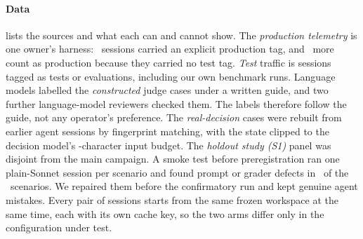 \paragraph{Data}  lists the sources and what each can and cannot show. The \emph{production
telemetry} is one owner's harness: \ObProdTagged\ sessions carried an explicit production tag, and \ObProdDefault\ more
count as production because they carried no test tag. \emph{Test} traffic is sessions tagged as tests or evaluations,
including our own benchmark runs. Language models labelled the \emph{constructed} judge cases under a written guide, and two further language-model
reviewers checked them. The labels therefore follow the guide, not any operator's preference. The \emph{real-decision} cases were rebuilt from earlier agent sessions by fingerprint matching,
with the state clipped to the decision model's \TrStateBudget-character input budget. The \emph{holdout study (S1)}
panel was disjoint from the main campaign. A smoke test before preregistration ran one plain-Sonnet session per
scenario and found prompt or grader defects in \SmokeFixed\ of the \SmokeN\ scenarios. We repaired them before the
confirmatory run and kept genuine agent mistakes. Every pair of sessions starts from the same frozen workspace at the
same time, each with its own cache key, so the two arms differ only in the configuration under test.

